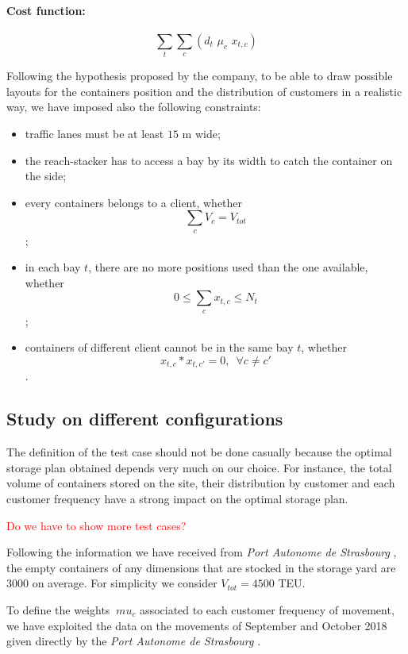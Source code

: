 \documentclass{article}
\newcommand{\ls}[1]{\textcolor{red}{#1}}
\newcommand{\PAS}{\emph{Port Autonome de Strasbourg }}
\begin{document}
\paragraph{Cost function:}

\begin{equation}
\displaystyle \sum_t \sum_c (d_t \,\, \mu_c \,\, x_{t,c})
\end{equation}



Following the hypothesis proposed by the company, to be able to draw possible layouts for the containers position and the distribution of customers in a realistic way, we have imposed also the following constraints:
\begin{itemize}
	\item traffic lanes must be at least $15$ m wide;
	\item the reach-stacker has to access a bay by its width to catch the container on the side;
	\item every containers belongs to a client, whether $$\sum_ {c} V_c = V_ {tot} $$;
	\item in each bay $ t $, there are no more positions used than the one available, whether $$0\le \sum_c x_{t,c} \le N_t$$;
	\item containers of different client cannot be in the same bay $t$, whether \linebreak $$x_{t,c}*x_{t,c'}=0, \,\,\, \forall c \neq c'$$.
\end{itemize}

\subsection{Study on different configurations} 

The definition of the test case should not be done casually because the optimal storage plan obtained depends very much on our choice. 
For instance, the total volume of containers stored on the site, their distribution by customer and each customer frequency have a strong impact on the optimal storage plan. 

\ls{Do we have to show more test cases?}

Following the information we have received from \PAS, the empty containers of any dimensions that are stocked in the storage yard are $3000$ on average.
For simplicity we consider $V_{tot}=4500$ TEU. 

To define the weights $ \ mu_c $ associated to each customer frequency of movement, we have exploited the data on the movements of September and October 2018 given directly by the \PAS.
 
\end{document}
